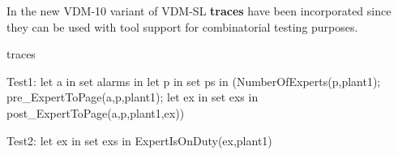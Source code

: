 In the new VDM-10 variant of VDM-SL {\bf\ttfamily traces} have been
incorporated since they can be used with tool support for
combinatorial testing purposes.

\begin{vdmsl}
traces

  Test1: let a in set alarms
         in
           let p in set ps 
           in
             (NumberOfExperts(p,plant1);
              pre_ExpertToPage(a,p,plant1);
              let ex in set exs
              in
                post_ExpertToPage(a,p,plant1,ex))
               
  Test2: let ex in set exs
         in
           ExpertIsOnDuty(ex,plant1)
\end{vdmsl}  
